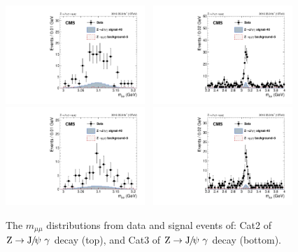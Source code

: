 \begin{figure}[p]
		  \centering
		  \includegraphics[width=0.47\textwidth]{Fig/Final_NoPreliminary/ZJpsiG/Mmumu_JpsiRange_alterBin_EBLR9}~
		  \includegraphics[width=0.47\textwidth]{Fig/Final_NoPreliminary/ZJpsiG/Mmumu_JpsiRange_WideRange_EBLR9}\\
		  \includegraphics[width=0.47\textwidth]{Fig/Final_NoPreliminary/ZJpsiG/Mmumu_JpsiRange_alterBin_EE}~
		  \includegraphics[width=0.47\textwidth]{Fig/Final_NoPreliminary/ZJpsiG/Mmumu_JpsiRange_WideRange_EE}\\
		  \caption{The $m_{\mu\mu}$ distributions from data and signal events of: Cat2 of $\mathrm{Z}\to{\mathrm{J}\hspace{-.08em}/\hspace{-.14em}\psi}\ \gamma$ decay (top), and Cat3 of $\mathrm{Z}\to{\mathrm{J}\hspace{-.08em}/\hspace{-.14em}\psi}\ \gamma$ decay (bottom). \label{fig:dist-2b}}
		\end{figure}
		

